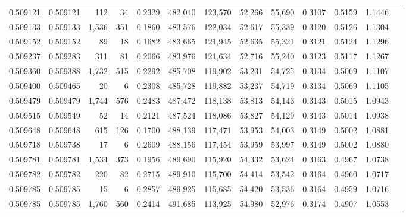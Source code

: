 \begin{tabular}{rrrrrrrrrrrrr}
0.509121 & 0.509121 &   112 &    34 &                                     0.2329 & 482,040 & 123,570 &  52,266 &  55,690 & 0.3107 & 0.5159 & 1.1446 \\
0.509133 & 0.509133 & 1,536 &   351 &                                     0.1860 & 483,576 & 122,034 &  52,617 &  55,339 & 0.3120 & 0.5126 & 1.1304 \\
0.509152 & 0.509152 &    89 &    18 &                                     0.1682 & 483,665 & 121,945 &  52,635 &  55,321 & 0.3121 & 0.5124 & 1.1296 \\
0.509237 & 0.509283 &   311 &    81 &                                     0.2066 & 483,976 & 121,634 &  52,716 &  55,240 & 0.3123 & 0.5117 & 1.1267 \\
0.509360 & 0.509388 & 1,732 &   515 &                                     0.2292 & 485,708 & 119,902 &  53,231 &  54,725 & 0.3134 & 0.5069 & 1.1107 \\
0.509400 & 0.509465 &    20 &     6 &                                     0.2308 & 485,728 & 119,882 &  53,237 &  54,719 & 0.3134 & 0.5069 & 1.1105 \\
0.509479 & 0.509479 & 1,744 &   576 &                                     0.2483 & 487,472 & 118,138 &  53,813 &  54,143 & 0.3143 & 0.5015 & 1.0943 \\
0.509515 & 0.509549 &    52 &    14 &                                     0.2121 & 487,524 & 118,086 &  53,827 &  54,129 & 0.3143 & 0.5014 & 1.0938 \\
0.509648 & 0.509648 &   615 &   126 &                                     0.1700 & 488,139 & 117,471 &  53,953 &  54,003 & 0.3149 & 0.5002 & 1.0881 \\
0.509718 & 0.509738 &    17 &     6 &                                     0.2609 & 488,156 & 117,454 &  53,959 &  53,997 & 0.3149 & 0.5002 & 1.0880 \\
0.509781 & 0.509781 & 1,534 &   373 &                                     0.1956 & 489,690 & 115,920 &  54,332 &  53,624 & 0.3163 & 0.4967 & 1.0738 \\
0.509782 & 0.509782 &   220 &    82 &                                     0.2715 & 489,910 & 115,700 &  54,414 &  53,542 & 0.3164 & 0.4960 & 1.0717 \\
0.509785 & 0.509785 &    15 &     6 &                                     0.2857 & 489,925 & 115,685 &  54,420 &  53,536 & 0.3164 & 0.4959 & 1.0716 \\
0.509785 & 0.509785 & 1,760 &   560 &                                     0.2414 & 491,685 & 113,925 &  54,980 &  52,976 & 0.3174 & 0.4907 & 1.0553 \\

\end{tabular}
